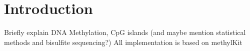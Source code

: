 \section{Introduction}

Briefly explain DNA Methylation, CpG islands (and maybe mention statistical methods and bisulfite sequencing?)
All implementation is based on methylKit \cite{23034086}
  
  
  
  
  
  
  
  
  
  